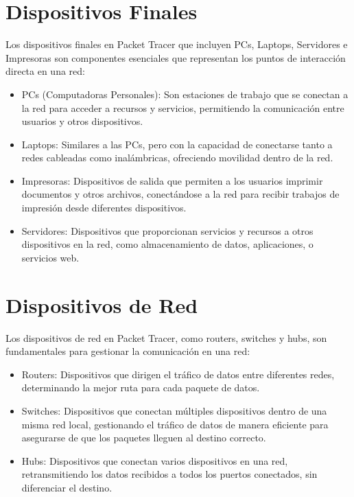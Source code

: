\documentclass{article}
\begin{document}
\section{Dispositivos Finales}
    Los dispositivos finales en Packet Tracer que incluyen PCs, Laptops, Servidores e Impresoras son componentes esenciales que representan los puntos de interacción directa en una red:
    \begin{itemize}
        \item PCs (Computadoras Personales): Son estaciones de trabajo que se conectan a la red para acceder a recursos y servicios, permitiendo la comunicación entre usuarios y otros dispositivos.
        \item Laptops: Similares a las PCs, pero con la capacidad de conectarse tanto a redes cableadas como inalámbricas, ofreciendo movilidad dentro de la red.
        \item Impresoras: Dispositivos de salida que permiten a los usuarios imprimir documentos y otros archivos, conectándose a la red para recibir trabajos de impresión desde diferentes dispositivos.
        \item Servidores: Dispositivos que proporcionan servicios y recursos a otros dispositivos en la red, como almacenamiento de datos, aplicaciones, o servicios web.
    \end{itemize}
    
\section{Dispositivos de Red}
    Los dispositivos de red en Packet Tracer, como routers, switches y hubs, son fundamentales para gestionar la comunicación en una red:
    \begin{itemize}
        \item Routers: Dispositivos que dirigen el tráfico de datos entre diferentes redes, determinando la mejor ruta para cada paquete de datos.
        \item Switches: Dispositivos que conectan múltiples dispositivos dentro de una misma red local, gestionando el tráfico de datos de manera eficiente para asegurarse de que los paquetes lleguen al destino correcto.
        \item Hubs: Dispositivos que conectan varios dispositivos en una red, retransmitiendo los datos recibidos a todos los puertos conectados, sin diferenciar el destino.
    \end{itemize}
        
\end{document}
